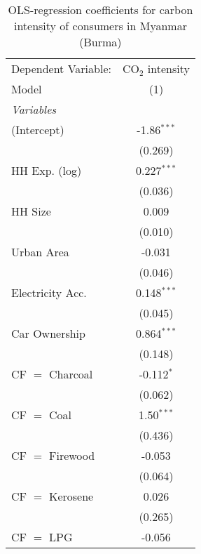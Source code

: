 
\begin{table}[htbp!]
   \centering
   \small
   \begin{adjustbox}{width = 1\textwidth, max height = 0.95\textheight, center}
      \begin{threeparttable}[b]
         \caption{\label{tab:OLS_1_MMR} OLS-regression coefficients for carbon intensity of consumers in Myanmar (Burma)}
         \begin{tabular}{lc}
            \tabularnewline \midrule \midrule
            Dependent Variable: & CO$_{2}$ intensity\\  
            Model               & (1)\\  
            \midrule
            \emph{Variables}\\
            (Intercept)         & -1.86$^{***}$\\   
                                & (0.269)\\   
            HH Exp. (log)       & 0.227$^{***}$\\   
                                & (0.036)\\   
            HH Size             & 0.009\\   
                                & (0.010)\\   
            Urban Area          & -0.031\\   
                                & (0.046)\\   
            Electricity Acc.    & 0.148$^{***}$\\   
                                & (0.045)\\   
            Car Ownership       & 0.864$^{***}$\\   
                                & (0.148)\\   
            CF $=$ Charcoal     & -0.112$^{*}$\\   
                                & (0.062)\\   
            CF $=$ Coal         & 1.50$^{***}$\\   
                                & (0.436)\\   
            CF $=$ Firewood     & -0.053\\   
                                & (0.064)\\   
            CF $=$ Kerosene     & 0.026\\   
                                & (0.265)\\   
            CF $=$ LPG          & -0.056\\   

\end{tabular}
\end{threeparttable}
\end{adjustbox}
\end{table}
